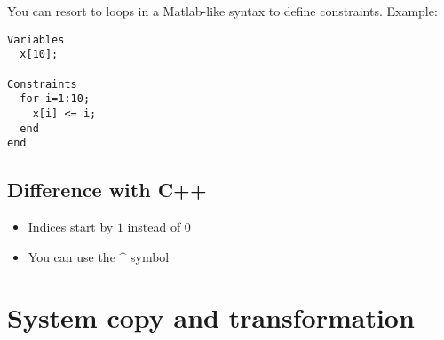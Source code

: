 You can resort to loops in a Matlab-like syntax to define constraints. Example:

\begin{verbatim}
Variables
  x[10];

Constraints
  for i=1:10;
    x[i] <= i;
  end
end
\end{verbatim}

\subsection{Difference with C++}

\begin{itemize}
\item Indices start by $1$ instead of $0$
\item You can use the \^{} symbol
\end{itemize}

\section{System copy and transformation}\label{sec:mod-sys-transfo}
